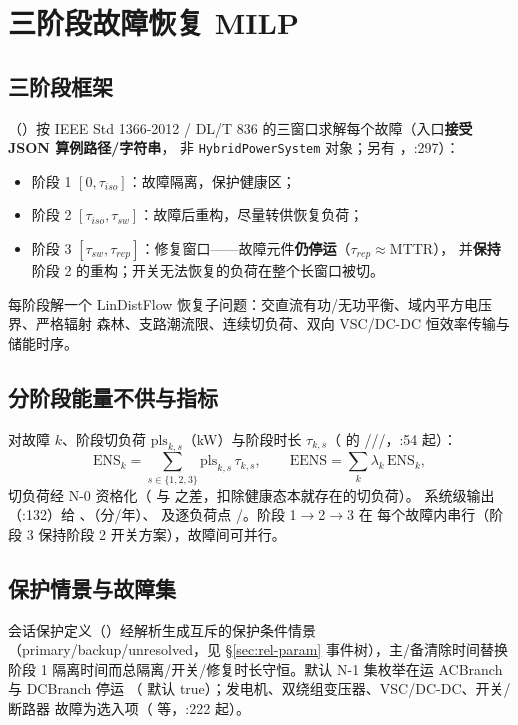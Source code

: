\section{三阶段故障恢复 MILP}\label{sec:rel-3stage}

\subsection{三阶段框架}
（）按 IEEE
Std 1366-2012 / DL/T 836 的三窗口求解每个故障（入口\textbf{接受 JSON 算例路径/字符串}，
非 \texttt{HybridPowerSystem} 对象；另有 ，:297）：
\begin{itemize}
  \item 阶段 1 $[0,\tau_{iso}]$：故障隔离，保护健康区；
  \item 阶段 2 $[\tau_{iso},\tau_{sw}]$：故障后重构，尽量转供恢复负荷；
  \item 阶段 3 $[\tau_{sw},\tau_{rep}]$：修复窗口——故障元件\textbf{仍停运}（$\tau_{rep}\approx$MTTR），
        并\textbf{保持}阶段 2 的重构；开关无法恢复的负荷在整个长窗口被切。
\end{itemize}
每阶段解一个 LinDistFlow 恢复子问题：交直流有功/无功平衡、域内平方电压界、严格辐射
森林、支路潮流限、连续切负荷、双向 VSC/DC-DC 恒效率传输与储能时序。

\subsection{分阶段能量不供与指标}
对故障 $k$、阶段切负荷 $\mathrm{pls}_{k,s}$（kW）与阶段时长 $\tau_{k,s}$（
的 ///，:54 起）：
\begin{equation}
\mathrm{ENS}_k=\sum_{s\in\{1,2,3\}}\mathrm{pls}_{k,s}\,\tau_{k,s},\qquad
\mathrm{EENS}=\sum_k \lambda_k\,\mathrm{ENS}_k,
\end{equation}
切负荷经 N-0 资格化（ 与  之差，扣除健康态本就存在的切负荷）。
系统级输出 （:132）给 、（分/年）、
 及逐负荷点 /。阶段 1$\to$2$\to$3 在
每个故障内串行（阶段 3 保持阶段 2 开关方案），故障间可并行。

\subsection{保护情景与故障集}
会话保护定义（）经解析生成互斥的保护条件情景
（primary/backup/unresolved，见 \S\ref{sec:rel-param} 事件树），主/备清除时间替换阶段 1
隔离时间而总隔离/开关/修复时长守恒。默认 N-1 集枚举在运 ACBranch 与 DCBranch 停运
（ 默认 true）；发电机、双绕组变压器、VSC/DC-DC、开关/断路器
故障为选入项（ 等，:222 起）。

